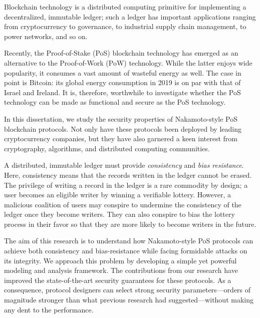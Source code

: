 Blockchain technology is a distributed computing primitive 
for implementing a decentralized, immutable ledger; 
such a ledger has important applications ranging 
from cryptocurrency to governance, to industrial supply chain management, 
to power networks, and so on.

Recently, the Proof-of-Stake (PoS) blockchain technology 
has emerged as an alternative 
to the Proof-of-Work (PoW) technology. 
While the latter enjoys wide popularity, 
it consumes a vast amount of wasteful energy as well. 
The case in point is Bitcoin: its global energy consumption in 2019 
is on par with that of Israel and Ireland.
It is, therefore, 
worthwhile to investigate 
whether the PoS technology can be made as functional and secure 
as the PoS technology.

In this dissertation, 
we study 
the security properties of 
Nakamoto-style PoS blockchain protocols. 
Not only have these protocols been deployed  
by leading cryptocurrency companies, 
but they have also garnered a keen interest from 
cryptography, algorithms, and distributed computing communities. 


A distributed, immutable ledger must provide 
\emph{consistency} and \emph{bias resistance}. 
Here, consistency means that the records written in the ledger cannot be erased. 
The privilege of writing a record in the ledger is 
a rare commodity by design; 
a user becomes an eligible writer by winning a verifiable lottery. 
However, a malicious coalition of users may conspire to 
undermine the consistency of the ledger once they become writers. 
They can also conspire to bias the lottery process in their favor 
so that they are more likely to become writers in the future. 

The aim of this research is to understand how
Nakamoto-style PoS protocols can achieve both consistency and bias-resistance 
while facing formidable attacks on its integrity.
We approach this problem by developing a simple yet powerful modeling and analysis framework.
The contributions from our research have 
improved the state-of-the-art security guarantees for these protocols. 
As a consequence, protocol designers can select 
strong security parameters---orders of magnitude stronger than 
what previous research had suggested---without
making any dent to the performance. 


